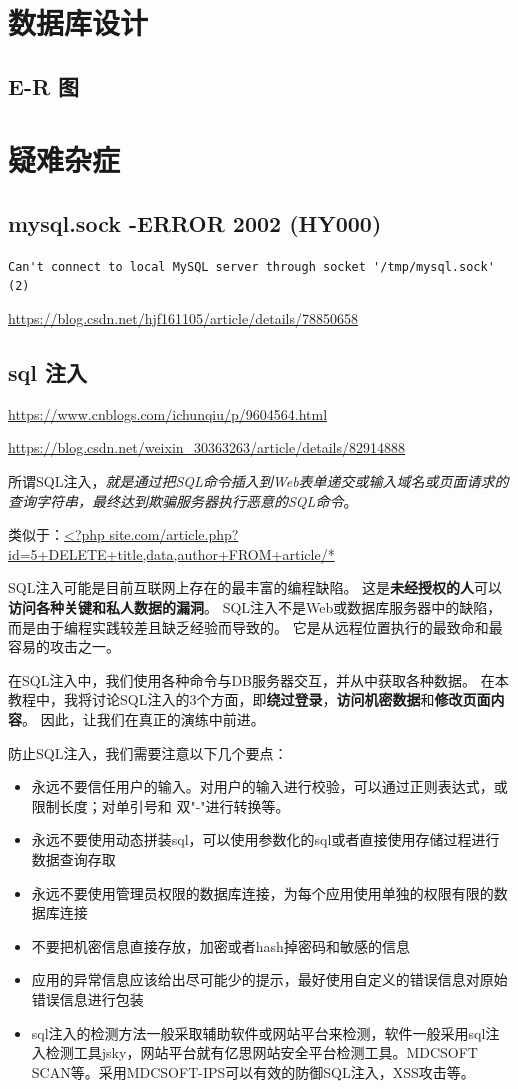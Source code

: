 \documentclass[UTF8,a4paper,12pt]{ctexbook}
\begin{document}
\chapter{数据库设计}
	\section{E-R 图}

		
		
		
\chapter{疑难杂症}
	\section{mysql.sock -ERROR 2002 (HY000)}
		
		\verb|Can't connect to local MySQL server through socket '/tmp/mysql.sock' (2)|
		
		\url{https://blog.csdn.net/hjf161105/article/details/78850658}
	
	\section{sql 注入}
		\url{https://www.cnblogs.com/ichunqiu/p/9604564.html}
		
		\url{https://blog.csdn.net/weixin_30363263/article/details/82914888}
		
		所谓SQL注入，\textit{就是通过把SQL命令插入到Web表单递交或输入域名或页面请求的查询字符串，最终达到欺骗服务器执行恶意的SQL命令}。
		
		类似于：\url{<?php site.com/article.php?id=5+DELETE+title,data,author+FROM+article/*}
	
		SQL注入可能是目前互联网上存在的最丰富的编程缺陷。 这是\textbf{未经授权的人}可以\textbf{访问各种关键和私人数据的漏洞}。 SQL注入不是Web或数据库服务器中的缺陷，而是由于编程实践较差且缺乏经验而导致的。 它是从远程位置执行的最致命和最容易的攻击之一。
		
		在SQL注入中，我们使用各种命令与DB服务器交互，并从中获取各种数据。 在本教程中，我将讨论SQL注入的3个方面，即\textbf{绕过登录}，\textbf{访问机密数据}和\textbf{修改页面内容}。 因此，让我们在真正的演练中前进。	
	
		防止SQL注入，我们需要注意以下几个要点：
		\begin{itemize}
			\item 永远不要信任用户的输入。对用户的输入进行校验，可以通过正则表达式，或限制长度；对单引号和 双"-"进行转换等。
			\item 永远不要使用动态拼装sql，可以使用参数化的sql或者直接使用存储过程进行数据查询存取
			\item 永远不要使用管理员权限的数据库连接，为每个应用使用单独的权限有限的数据库连接
			\item 不要把机密信息直接存放，加密或者hash掉密码和敏感的信息
			\item 应用的异常信息应该给出尽可能少的提示，最好使用自定义的错误信息对原始错误信息进行包装
			\item sql注入的检测方法一般采取辅助软件或网站平台来检测，软件一般采用sql注入检测工具jsky，网站平台就有亿思网站安全平台检测工具。MDCSOFT SCAN等。采用MDCSOFT-IPS可以有效的防御SQL注入，XSS攻击等。
		\end{itemize}    
\end{document}
